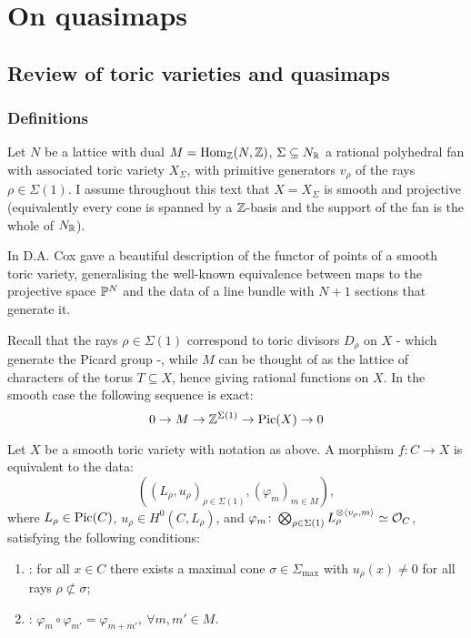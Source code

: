 \chapter{On quasimaps}\label{ch:qm}

\section{Review of toric varieties and quasimaps}\label{sec:qm_review}

\subsection{Definitions} Let $N$ be a lattice with dual $M=\operatorname{Hom}_{\mathbb{Z}}(N,\mathbb{Z})$, $\Sigma\subseteq N_{\mathbb{R}}$ a rational polyhedral fan with associated toric variety $X_{\Sigma}$, with primitive generators $v_{\rho}$ of the rays $\rho\in\Sigma(1)$. I assume throughout this text that $X=X_{\Sigma}$ is smooth and projective (equivalently every cone is spanned by a $\mathbb{Z}$-basis and the support of the fan is the whole of $N_{\mathbb{R}}$).

In \cite{CoxFunctor} D.A. Cox gave a beautiful description of the functor of points of a smooth toric variety, generalising the well-known equivalence between maps to the projective space $\mathbb P^N$ and the data of a line bundle with $N+1$ sections that generate it.

Recall that the rays $\rho\in\Sigma(1)$ correspond to toric divisors $D_{\rho}$ on $X$ - which generate the Picard group -, while $M$ can be thought of as the lattice of characters of the torus $T\subseteq X$, hence giving rational functions on $X$. In the smooth case the following sequence is exact:
\begin{equation}\label{eq:toric_Pic_es} 0\rightarrow M\rightarrow \mathbb{Z}^{\Sigma(1)}\rightarrow \operatorname{Pic}(X)\rightarrow 0\end{equation}

\begin{thm}[Cox]
 Let $X$ be a smooth toric variety with notation as above. A morphism $f\colon C\to X$ is equivalent to the data:
 \[\left((L_\rho,u_\rho)_{\rho\in\Sigma(1)},(\varphi_m)_{m\in M}\right),\]
 where $L_\rho\in\operatorname{Pic}(C)$, $u_\rho\in H^0(C,L_\rho)$, and $\varphi_m\colon \bigotimes_{\rho\in\Sigma(1)}L_\rho^{\otimes \langle v_\rho, m\rangle}\simeq \mathcal{O}_C$, satisfying the following conditions:
 \begin{enumerate}
\item {}: for all $x \in C$ there exists a maximal cone $\sigma \in \Sigma_{\operatorname{max}}$ with $u_\rho(x) \neq 0$ for all rays $\rho \not\subset \sigma$;
\item {}: $\varphi_m\circ\varphi_{m'}=\varphi_{m+m'},\ \forall m,m'\in M$.
\end{enumerate}
\end{thm}

